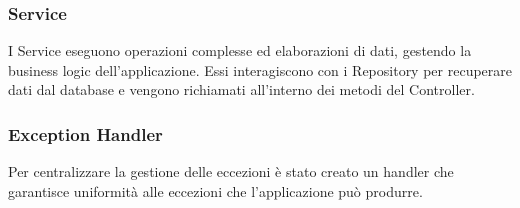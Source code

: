 \subsubsection*{Service}
I Service eseguono operazioni complesse ed elaborazioni di dati, gestendo la business logic dell'applicazione. Essi interagiscono con i Repository per recuperare dati dal database e vengono richiamati all'interno dei metodi del Controller.
\subsubsection*{Exception Handler}
Per centralizzare la gestione delle eccezioni è stato creato un handler che garantisce uniformità alle eccezioni che l'applicazione può produrre.\\
